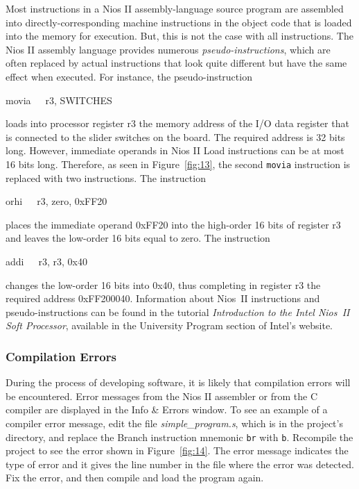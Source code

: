 \documentclass[11pt, twoside, pdftex]{article}
\begin{document}
\newpage
Most instructions in a Nios II assembly-language source program
are assembled into directly-corresponding machine instructions in
the object code that is loaded into the memory for execution.
But, this is not the case with all instructions. The Nios II
assembly language provides numerous {\it pseudo-instructions},
which are often replaced by actual instructions that look
quite different but have the same effect when executed.
For instance, the pseudo-instruction
\begin{center}
movia~~~r3, SWITCHES
\end{center}
\noindent
loads into processor register r3 the memory address of the I/O
data register that is connected to the slider switches on the
board. The required address is 32 bits long. However, immediate
operands in Nios II Load instructions can be at most 16 bits
long. Therefore, as seen in Figure~\ref{fig:13}, 
the second \texttt {movia} instruction is replaced with two
instructions. The instruction 
\begin{center}
orhi~~~r3, zero, 0xFF20
\end{center}
\noindent
places the immediate operand 0xFF20 into the high-order 16 bits
of register r3 and leaves the low-order 16 bits equal to zero.
The instruction
\begin{center}
addi~~~r3, r3, 0x40
\end{center}
\noindent
changes the low-order 16 bits into 0x40, thus completing in
register r3 the required address 0xFF200040.
Information about Nios~II instructions and
pseudo-instructions can be found in the tutorial
\emph{Introduction to the Intel Nios~II Soft Processor}, available in the University Program section of Intel's website.


\subsubsection{Compilation Errors}

During the process of developing software, it is likely that compilation errors will be 
encountered. Error messages from the Nios II assembler or from
the C compiler are displayed in the \textsf{Info \& Errors}
window. To see an example of a compiler error message, edit
the file {\it simple\_program.s}, which is in the project's directory, and replace the Branch instruction mnemonic 
\texttt {br} with \texttt {b}.
Recompile the project to see the error shown in Figure~\ref{fig:14}. 
The error message indicates the type of error and it gives the
line number in the file where the error was detected. Fix the
error, and then compile and load the program again.
\end{document}
